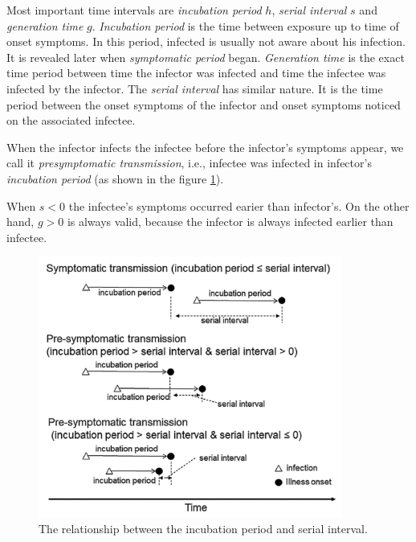 \documentclass[
  digital, %
  oneside, %
  lof,     %
  lot,     %
]{fithesis4}
\begin{document}
Most important time intervals are 
\textit{incubation period} $h$, \textit{serial interval} $s$ and \textit{generation time} $g$.
\textit{Incubation period} is the time between exposure up to time of onset 
symptoms. In this period, infected is usually not aware about his infection.
It is revealed later when \textit{symptomatic period} began.
\textit{Generation time} is the exact time period between time
the infector was infected and time the infectee was infected by the infector.
The \textit{serial interval} has similar nature. It is 
the time period between the onset symptoms of the infector 
and onset symptoms noticed on the associated infectee.


When the infector infects the infectee before the infector's
symptoms appear, we call it \textit{presymptomatic transmission}, i.e.,
infectee was infected in infector's \textit{incubation period}
(as shown in the figure \ref{fig:nishiura-transmission}).

When $s < 0$ the infectee's symptoms occurred earier than infector's.
On the other hand, $g > 0$ is always
valid, because the infector is always infected earlier than infectee.

\begin{figure}[h]
  \includegraphics[width=10cm]{static/images/nishiura2020_terms.png}
  \caption{The relationship between the incubation period and serial interval. \cite{nishiura2020}}
  \label{fig:nishiura-transmission}
\end{figure}
\end{document}
